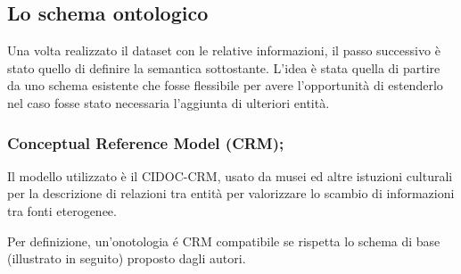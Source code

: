 \documentclass[11pt,a4paper]{article}
\begin{document}





\subsection{Lo schema ontologico}
Una volta realizzato il dataset con le relative informazioni, il passo successivo è stato quello di definire la semantica sottostante. L'idea è stata quella di partire da uno schema esistente che fosse flessibile per avere l'opportunità di estenderlo nel caso fosse stato necessaria l'aggiunta di ulteriori entità.

\subsubsection{Conceptual Reference Model (CRM);}
Il modello utilizzato è il CIDOC-CRM, usato da musei ed altre istuzioni culturali per la descrizione di relazioni tra entità per valorizzare lo scambio di informazioni tra fonti eterogenee.
 
Per definizione, un'onotologia \'e CRM compatibile se rispetta lo schema di base (illustrato in seguito) proposto dagli autori.
\end{document}
